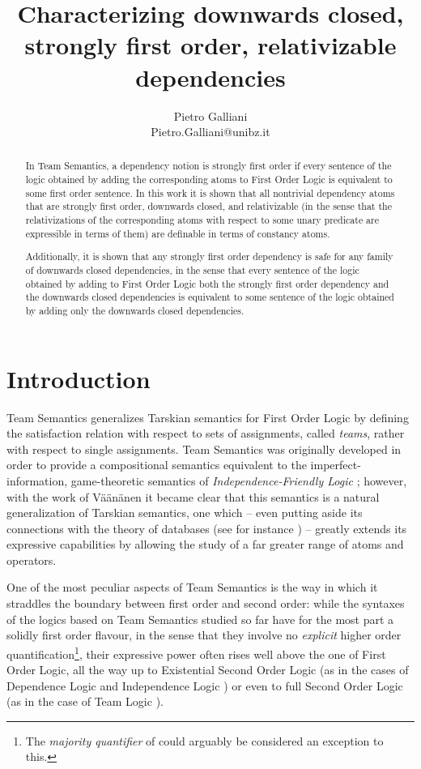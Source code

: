 \documentclass{article}
\title{Characterizing downwards closed, strongly first order, relativizable dependencies}
\author{Pietro Galliani\\Pietro.Galliani@unibz.it}
\theoremstyle{definition}
\begin{document}
\maketitle

\begin{abstract}
In Team Semantics, a dependency notion is strongly first order if every sentence of the logic obtained by adding the corresponding atoms to First Order Logic is equivalent to some first order sentence. In this work it is shown that all nontrivial dependency atoms that are strongly first order, downwards closed, and relativizable (in the sense that the relativizations of the corresponding atoms with respect to some unary predicate are expressible in terms of them) are definable in terms of constancy atoms. 

Additionally, it is shown that any strongly first order dependency is safe for any family of downwards closed dependencies, in the sense that every sentence of the logic obtained by adding to First Order Logic both the strongly first order dependency and the downwards closed dependencies is equivalent to some sentence of the logic obtained by adding only the downwards closed dependencies. 
\end{abstract}

\section{Introduction}
Team Semantics \cite{hodges97} generalizes Tarskian semantics for First Order Logic by defining the satisfaction relation with respect to sets of assignments, called \emph{teams}, rather with respect to single assignments. Team Semantics was originally developed in order to provide a compositional semantics equivalent to the imperfect-information, game-theoretic semantics of \emph{Independence-Friendly Logic} \cite{hintikkasandu89,hintikka96,mann11}; however, with the work of V\"a\"an\"anen \cite{vaananen07} it became clear that this semantics is a natural generalization of Tarskian semantics, one which -- even putting aside its connections with the theory of databases (see for instance  \cite{kontinen13}) -- greatly extends its expressive capabilities by allowing the study of a far greater range of atoms and operators. 

One of the most peculiar aspects of Team Semantics is the way in which it straddles the boundary between first order and second order: while the syntaxes of the logics based on Team Semantics studied so far have for the most part a solidly first order flavour, in the sense that they involve no \emph{explicit} higher order quantification\footnote{The \emph{majority quantifier} of \cite{durand2015dependence} could arguably be considered an exception to this.}, their expressive power often rises well above the one of First Order Logic, all the way up to Existential Second Order Logic (as in the cases of Dependence Logic \cite{vaananen07} and Independence Logic \cite{gradel13}) or even to full Second Order Logic (as in the case of Team Logic \cite{vaananen07b,kontinen2011team}). 
\end{document}
